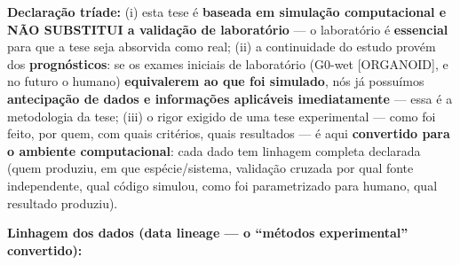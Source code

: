 \documentclass[
  12pt,
]{report}
\begin{document}
\textbf{Declaração tríade:} (i) esta tese é \textbf{baseada em simulação
computacional e NÃO SUBSTITUI a validação de laboratório} --- o
laboratório é \textbf{essencial} para que a tese seja absorvida como
real; (ii) a continuidade do estudo provém dos \textbf{prognósticos}: se
os exames iniciais de laboratório (G0-wet {[}ORGANOID{]}, e no futuro o
humano) \textbf{equivalerem ao que foi simulado}, nós já possuímos
\textbf{antecipação de dados e informações aplicáveis imediatamente} ---
essa é a metodologia da tese; (iii) o rigor exigido de uma tese
experimental --- como foi feito, por quem, com quais critérios, quais
resultados --- é aqui \textbf{convertido para o ambiente computacional}:
cada dado tem linhagem completa declarada (quem produziu, em que
espécie/sistema, validação cruzada por qual fonte independente, qual
código simulou, como foi parametrizado para humano, qual resultado
produziu).

\textbf{Linhagem dos dados (data lineage --- o ``métodos experimental''
convertido):}
\end{document}
